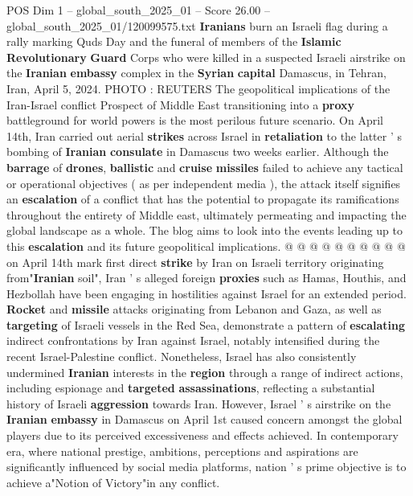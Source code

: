 \begin{textsample}{POS Dim 1 – global\_south\_2025\_01 – Score 26.00 – global\_south\_2025\_01/120099575.txt}  \label{ex:f1_pos_303}
\textbf{Iranians} burn an Israeli flag during a rally marking Quds Day and the funeral of members of the \textbf{Islamic} \textbf{Revolutionary} \textbf{Guard} Corps who were killed in a suspected Israeli airstrike on the \textbf{Iranian} \textbf{embassy} complex in the \textbf{Syrian} \textbf{capital} Damascus, in Tehran, Iran, April 5, 2024.
PHOTO : REUTERS The geopolitical implications of the Iran-Israel conflict Prospect of Middle East transitioning into a \textbf{proxy} battleground for world powers is the most perilous future scenario.
On April 14th, Iran carried out aerial \textbf{strikes} across Israel in \textbf{retaliation} to the latter ' s bombing of \textbf{Iranian} \textbf{consulate} in Damascus two weeks earlier.
Although the \textbf{barrage} of \textbf{drones}, \textbf{ballistic} and \textbf{cruise} \textbf{missiles} failed to achieve any tactical or operational objectives ( as per independent media ), the attack itself signifies an \textbf{escalation} of a conflict that has the potential to propagate its ramifications throughout the entirety of Middle east, ultimately permeating and impacting the global landscape as a whole.
The blog aims to look into the events leading up to this \textbf{escalation} and its future geopolitical implications. @ @ @ @ @ @ @ @ @ @ on April 14th mark first direct \textbf{strike} by Iran on Israeli territory originating from"\textbf{Iranian} soil", Iran ' s alleged foreign \textbf{proxies} such as Hamas, Houthis, and Hezbollah have been engaging in hostilities against Israel for an extended period. \textbf{Rocket} and \textbf{missile} attacks originating from Lebanon and Gaza, as well as \textbf{targeting} of Israeli vessels in the Red Sea, demonstrate a pattern of \textbf{escalating} indirect confrontations by Iran against Israel, notably intensified during the recent Israel-Palestine conflict.
Nonetheless, Israel has also consistently undermined \textbf{Iranian} interests in the \textbf{region} through a range of indirect actions, including espionage and \textbf{targeted} \textbf{assassinations}, reflecting a substantial history of Israeli \textbf{aggression} towards Iran.
However, Israel ' s airstrike on the \textbf{Iranian} \textbf{embassy} in Damascus on April 1st caused concern amongst the global players due to its perceived excessiveness and effects achieved.
In contemporary era, where national prestige, ambitions, perceptions and aspirations are significantly influenced by social media platforms, nation ' s prime objective is to achieve a"Notion of Victory"in any conflict.

\end{textsample}
